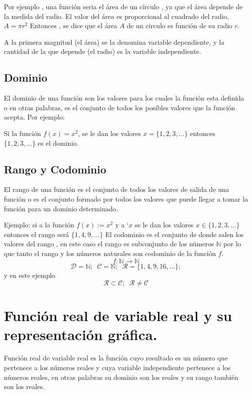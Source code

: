 \documentclass[oneside,spanish,letterpaper]{extbook}
\theoremstyle{mythmstyle}
\begin{document}
Por ejemplo , una función seria el área de un círculo , ya que el área depende de la medida del radio. 
El valor del área es proporcional al cuadrado del radio, $A = \pi r^2$   
Entonces , se dice que el área $A$ de un circulo es función de su radio $r$.

 A la primera magnitud (el área) se la denomina variable dependiente, y la cantidad de la que depende
 (el radio) es la variable independiente.



\subsection{Dominio}


El dominio de una función son los valores  para los cuales la función esta definida o en otras palabras,
es el conjunto de todos los posibles valores que la función acepta.
Por ejemplo:

Si la función $f(x) = x^2$,     se le dan los valores $x = \{1,2,3,...\}$ entonces $\{1,2,3,...\}$ es el dominio.

\subsection{Rango y Codominio}
 
El rango de una función es el conjunto de todos los valores de salida de una función o es el conjunto
formado por todos los valores que puede llegar a tomar la función para un dominio determinado.

Ejemplo: si a la función $f(x) := x^2$ y a `$x$ se le dan los valores $x \in \{1,2,3,...\}$
entonces el rango será $\{1,4,9,...\}$
\cite{cd4}
El codominio es el conjunto de donde salen los valores del rango , en este caso el rango es subconjunto
de los números $\mathbb{N}$ por lo que tanto el rango y los números naturales son codominio de la función $f$.
$$f:\mathbb{N}\longrightarrow \mathbb{N}$$
$$\mathscr{D}=\mathbb{N};\;\;\mathscr{C}=\mathbb{N};\;\;\mathscr{R}=\{1,4,9,16,...\}; $$
y en este ejemplo
$$\mathscr{R} \subset \mathscr{C};\;\; \mathscr{R} \neq \mathscr{C}$$
\section{Función real de variable real y su representación gráfica.}
Función real de variable real es la función cuyo resultado es un número que pertenece a los números reales y cuya variable
independiente pertenece a los números reales, en otras palabras su dominio son los reales y su rango también son los reales.
\end{document}
